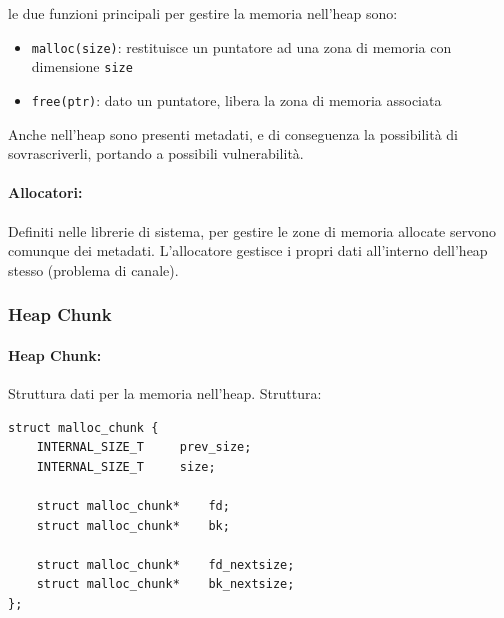 le due funzioni principali per gestire la memoria nell'heap sono: 
\begin{itemize}
	\item \texttt{malloc(size)}: restituisce un puntatore ad una zona di memoria con dimensione \texttt{size}
	
    \item \texttt{free(ptr)}: dato un puntatore, libera la zona di memoria associata
\end{itemize}

Anche nell'heap sono presenti metadati, e di conseguenza la possibilità di sovrascriverli, portando a possibili vulnerabilità.

\paragraph{Allocatori:} Definiti nelle librerie di sistema, per gestire le zone di memoria allocate servono comunque dei metadati. L'allocatore gestisce i propri dati all'interno dell'heap stesso (problema di canale).

\vfill

\subsubsection{Heap Chunk} 

\paragraph{Heap Chunk:} Struttura dati per la memoria nell'heap. Struttura:
\begin{verbatim}
struct malloc_chunk {
    INTERNAL_SIZE_T     prev_size; 
    INTERNAL_SIZE_T     size; 

    struct malloc_chunk*    fd;
    struct malloc_chunk*    bk;

    struct malloc_chunk*    fd_nextsize;
    struct malloc_chunk*    bk_nextsize;
};
\end{verbatim}

